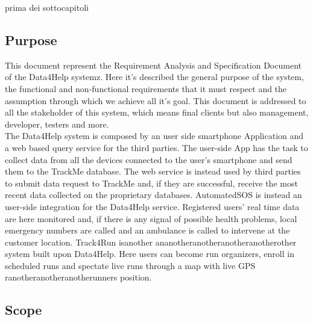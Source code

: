 prima dei sottocapitoli
\subsection{Purpose}
This document represent the Requirement Analysis and Specification Document of the Data4Help systemz. Here it's described the general purpose of the system, the functional and non-functional requirements that it must respect and the assumption through which we achieve all it's goal. This document is addressed to all the stakeholder of this system, which means final clients but also management, developer, testers and more.\\
The Data4Help system is composed by an user side smartphone Application and a web based query service for the third parties. The user-side App has the task to collect data from all the devices connected to the user's smartphone and send them to the TrackMe database. The web service is instead used by third parties to submit data request to TrackMe and, if they are successful, receive the most recent data collected on the proprietary databases.
AutomatedSOS is instead an user-side integration for the Data4Help service. Registered users' real time data are here monitored and, if there is any signal of possible health problems, local emergency numbers are called and an ambulance is called to intervene at the customer location.
Track4Run isanother ananotheranotheranotheranotherother system built upon Data4Help. Here users can become run organizers, enroll in scheduled runs and spectate live runs through a map with live GPS ranotheranotheranotherunners position.
\subsection{Scope}

